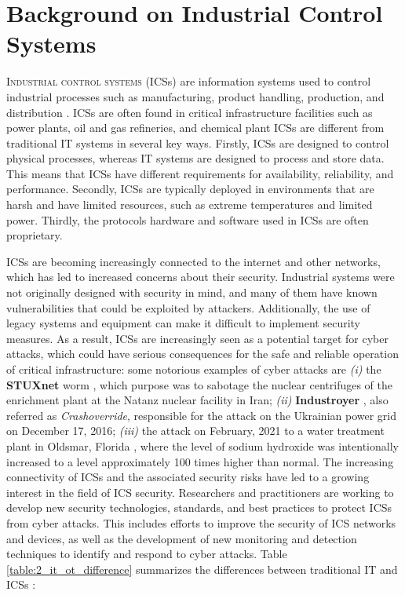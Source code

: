 \chapter{Background on Industrial Control Systems}
\label{background}

\linenumbers
\lettrine[lines=2]{I}{ndustrial control systems} (ICSs) are information systems used to control industrial processes such as manufacturing, product handling, production, and distribution \cite{ics_definition}. ICSs are often found in critical infrastructure facilities such as power plants, oil and gas refineries, and chemical plant
\bigskip
ICSs are different from traditional IT systems in several key ways. Firstly, ICSs are designed to control physical processes, whereas IT systems are designed to process and store data. This means that ICSs have different requirements for availability, reliability, and performance. Secondly, ICSs are typically deployed in environments that are harsh and have limited resources, such as extreme temperatures and limited power. Thirdly, the protocols hardware and software used in ICSs are often proprietary. 

\bigskip
ICSs are becoming increasingly connected to the internet and other networks, which has led to increased concerns about their security. Industrial systems were not originally designed with security in mind, and many of them have known vulnerabilities that could be exploited by attackers. Additionally, the use of legacy systems and equipment can make it difficult to implement security measures. As a result, ICSs are increasingly seen as a potential target for cyber attacks, which could have serious consequences for the safe and reliable operation of critical infrastructure: some notorious examples of cyber attacks are \textit{(i)} the \textbf{STUXnet} worm \cite{stuxnet}, which purpose was to sabotage the nuclear centrifuges of the enrichment plant at the Natanz nuclear facility in Iran; \textit{(ii)} \textbf{Industroyer} \cite{industroyer}, also referred as \textit{Crashoverride}, responsible for the attack on the Ukrainian power grid on December 17, 2016; \textit{(iii)} the attack on February, 2021 to a water treatment plant in Oldsmar, Florida \cite{attacco_florida}, where the level of sodium hydroxide was intentionally increased to a level approximately 100 times higher than normal. \newline \newline
The increasing connectivity of ICSs and the associated security risks have led to a growing interest in the field of ICS security. Researchers and practitioners are working to develop new security technologies, standards, and best practices to protect ICSs from cyber attacks. This includes efforts to improve the security of ICS networks and devices, as well as the development of new monitoring and detection techniques to identify and respond to cyber attacks.\newline \newline
Table \ref{table:2_it_ot_difference} summarizes the differences between traditional IT and ICSs \cite{tesi_phd_norvegese}:

